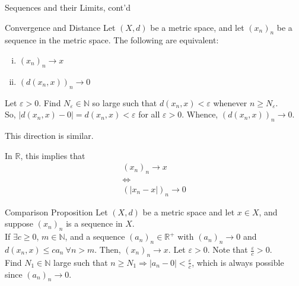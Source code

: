 \documentclass[8pt]{extarticle}
\newcommand{\N}{\mathbb{N}}
\newcommand{\R}{\mathbb{R}}
\begin{document}
  \begin{problem}{Sequences and their Limits, cont'd}
    \begin{problem}{Convergence and Distance}
      Let $(X,d)$ be a metric space, and let $(x_n)_n$ be a sequence in the metric space. The following are equivalent:
      \begin{enumerate}[(i)]
        \item $(x_n)_n\rightarrow x$
        \item $\left(d(x_n,x)\right)_n \rightarrow 0$
      \end{enumerate}
      \tcblower
      \begin{description}[font=\normalfont]
        \item[(i) $\Rightarrow$ (b)] Let $\varepsilon > 0$. Find $N_{\varepsilon}\in\N$ so large such that $d(x_n,x) < \varepsilon$ whenever $n \geq N_{\varepsilon}$.\\

          So, $|d(x_n,x)-0| = d(x_n,x) < \varepsilon$ for all $\varepsilon > 0$. Whence, $\left(d(x_n,x)\right)_n \rightarrow 0$.
        \item[(ii) $\Rightarrow$ (i)] This direction is similar.
      \end{description}
    \end{problem}
    In $\R$, this implies that
    \begin{align*}
      (x_n)_n \rightarrow x\\
      \Leftrightarrow\\
      (|x_n -x|)_n \rightarrow 0
    \end{align*}
    \begin{problem}{Comparison Proposition}
      Let $(X,d)$ be a metric space and let $x\in X$, and suppose $(x_n)_n$ is a sequence in $X$.\\

      If $\exists c\geq 0$, $m\in\N$, and a sequence $(a_n)_n\in\R^+$ with $(a_n)_n \rightarrow 0$ and $d(x_n,x) \leq c a_n~\forall n > m$. Then, $(x_n)_n\rightarrow x$.
      \tcblower
      Let $\varepsilon > 0$. Note that $\frac{\varepsilon}{c} > 0$.\\

      Find $N_1\in \N$ large such that $n \geq N_1 \Rightarrow |a_n - 0| < \frac{\varepsilon}{c}$, which is always possible since $(a_n)_n \rightarrow 0$.\\


\end{problem}
\end{problem}
\end{document}

